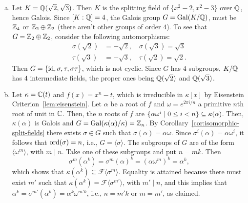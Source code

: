 \begin{xmpls}
\begin{enumerate}[a), font=\upshape]
        \item Let $K = \mathbb{Q}(\sqrt2,\sqrt3)$. Then $K$ is the splitting field of $\{x^2 - 2, x^2 - 3\}$ over $\mathbb{Q}$, hence Galois. Since $[K:\mathbb{Q}]=4$, the Galois group $G=\operatorname{Gal}(K/\mathbb{Q})$, must be $\mathbb{Z}_4$ or $\mathbb{Z}_2\oplus\mathbb{Z}_2$ (there aren't other groups of order $4$). To see that $G=\mathbb{Z}_2\oplus\mathbb{Z}_2$, consider the following automorphisms:
        \begin{align*}
            \sigma(\sqrt2)&=-\sqrt2,\quad\sigma(\sqrt3)=\sqrt3\\
            \tau(\sqrt3)&=-\sqrt3,\quad\tau(\sqrt2)=\sqrt2.
        \end{align*}
        Then $G=\{\operatorname{id},\sigma,\tau,\sigma\tau\}$, which is not cyclic. Since $G$ has $4$ subgroups, $K/\mathbb{Q}$ has $4$ intermediate fields, the proper ones being $\mathbb{Q}(\sqrt2)$ and $\mathbb{Q}(\sqrt3)$.

        \item Let $\kappa=\mathbb{C}(t)$ and $f(x)=x^n-t$, which is irreducible in $\kappa[x]$ by Eisenstein Criterion~\ref{lem:eisenstein}. Let $\alpha$ be a root of $f$ and $\omega=e^{2\pi i/n}$ a primitive $n$th root of unit in $\mathbb{C}$. Then, the $n$ roots of $f$ are $\{\alpha\omega^i\mid0\le i<n\}\subseteq\kappa(\alpha)$. Then, $\kappa(\alpha)$ is Galois and $G=\operatorname{Gal}(\kappa(\alpha)/\kappa)=\mathbb{Z}_n$. By Corollary~\ref{cor:isomorphic-split-fields} there exists $\sigma\in G$ such that $\sigma(\alpha)=\alpha\omega$. Since $\sigma^i(\alpha)=\alpha\omega^i$, it follows that ${\rm ord}(\sigma)=n$, i.e., $G=\langle\sigma\rangle$. The subgroups of $G$ are of the form $\langle\omega^m\rangle$, with $m\mid n$. Take one of these subgroups and put $n=mk$. Then 
        $$
            \sigma^m(\alpha^k)=\sigma^m(\alpha)^k=(\alpha\omega^m)^k
                =\alpha^k,
        $$
        which shows that $\kappa(\alpha^k)\subseteq\mathcal F\langle\sigma^m\rangle$. Equality is attained because there must exist $m'$ such that $\kappa(\alpha^k)=\mathcal F\langle\sigma^{m'}\rangle$, with $m'\mid n$, and this implies that $\alpha^k=\sigma^{m'}(\alpha^k)=\alpha^k\omega^{m'k}$, i.e., $n=m'k$ or $m=m'$, as claimed.
    \end{enumerate}
\end{xmpls}

